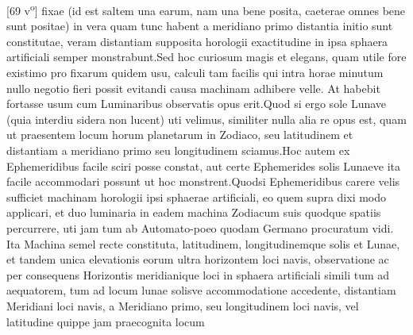 [69 v\textsuperscript{o}] fixae\protect{} (id est saltem una earum, nam una bene posita, caeterae omnes bene sunt positae) in vera quam tunc habent a meridiano\protect{} primo distantia initio sunt constitutae, veram distantiam supposita horologii\protect{} exactitudine in ipsa sphaera artificiali semper monstrabunt.\pend \pstart Sed hoc curiosum magis et elegans, quam utile fore existimo pro fixarum\protect{} quidem usu, calculi tam facilis qui intra horae minutum nullo negotio fieri possit evitandi causa machinam adhibere velle. At habebit fortasse usum cum Luminaribus observatis opus erit.\pend \pstart Quod si ergo sole\protect{} Lunave\protect{} (quia interdiu sidera\protect{}  non lucent) uti velimus, similiter nulla alia re opus est, quam ut praesentem locum horum planetarum in Zodiaco\protect{}, seu latitudinem\protect{} et distantiam a meridiano\protect{} primo seu longitudinem \protect{} sciamus.\pend \pstart Hoc autem ex Ephemeridibus \protect{} facile sciri posse constat, aut certe Ephemerides\protect{} solis\protect{} Lunaeve\protect{} ita facile accommodari possunt ut hoc monstrent.\pend \pstart Quodsi Ephemeridibus\protect{} carere velis sufficiet machinam horologii \protect{} ipsi sphaerae artificiali, eo quem supra dixi modo applicari, et duo luminaria in eadem machina Zodiacum\protect{} suis quodque spatiis percurrere, uti jam tum ab Automato-poeo quodam Germano procuratum vidi. Ita Machina semel recte constituta, latitudinem\protect{}, longitudinemque\protect{} solis\protect{} et Lunae\protect{}, et tandem unica elevationis eorum ultra horizontem loci navis\protect{}, observatione ac per consequens Horizontis meridianique\protect{} loci in sphaera artificiali simili tum ad aequatorem\protect{}, tum ad locum lunae\protect{} solisve\protect{} accommodatione accedente, distantiam Meridiani\protect{} loci navis\protect{}, a Meridiano\protect{} primo, seu longitudinem\protect{} loci navis\protect{}, vel \lbrack latitudine\protect{} quippe jam praecognita\rbrack {} locum 